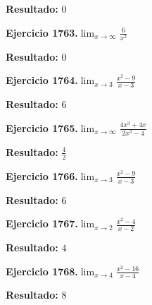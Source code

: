 \documentclass[10pt,a4paper]{article}
\begin{document}
\begin{solbox}
\textbf{Resultado:} \(\displaystyle 0\)
\end{solbox}

\begin{ejbox}
\textbf{Ejercicio 1763.}\quad $\lim_{x\to \infty} \frac{6}{x^2}$
\end{ejbox}

\begin{solbox}
\textbf{Resultado:} \(\displaystyle 0\)
\end{solbox}

\begin{ejbox}
\textbf{Ejercicio 1764.}\quad $\lim_{x\to 3} \frac{x^2-9}{x-3}$
\end{ejbox}

\begin{solbox}
\textbf{Resultado:} \(\displaystyle 6\)
\end{solbox}

\newpage
\begin{ejbox}
\textbf{Ejercicio 1765.}\quad $\lim_{x\to \infty} \frac{4x^3 + 4x}{2x^3 - 4}$
\end{ejbox}

\begin{solbox}
\textbf{Resultado:} \(\displaystyle \frac{4}{2}\)
\end{solbox}

\begin{ejbox}
\textbf{Ejercicio 1766.}\quad $\lim_{x\to 3} \frac{x^2-9}{x-3}$
\end{ejbox}

\begin{solbox}
\textbf{Resultado:} \(\displaystyle 6\)
\end{solbox}

\begin{ejbox}
\textbf{Ejercicio 1767.}\quad $\lim_{x\to 2} \frac{x^2-4}{x-2}$
\end{ejbox}

\begin{solbox}
\textbf{Resultado:} \(\displaystyle 4\)
\end{solbox}

\newpage
\begin{ejbox}
\textbf{Ejercicio 1768.}\quad $\lim_{x\to 4} \frac{x^2-16}{x-4}$
\end{ejbox}

\begin{solbox}
\textbf{Resultado:} \(\displaystyle 8\)
\end{solbox}
\end{document}
